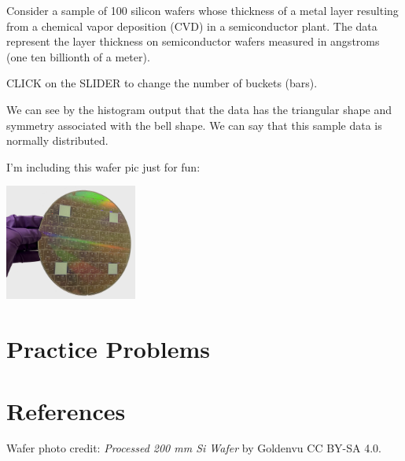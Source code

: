 \documentclass{ximera}
\begin{document}
 
\begin{exploration}\label{exp:histogram1}
Consider a sample of 100 silicon wafers whose thickness of a metal layer resulting from a chemical vapor deposition (CVD) in a semiconductor plant. The data represent the layer thickness on semiconductor wafers measured in angstroms (one ten billionth of a meter).


CLICK on the SLIDER to change the number of buckets (bars).

\begin{onlineOnly}
\begin{center} 
\end{center}
\end{onlineOnly}

We can see by the histogram output that the data has the triangular shape and symmetry associated with the bell shape. We can say that this sample data is normally distributed.


\end{exploration}

I'm including this wafer pic just for fun:

\begin{image}
         \includegraphics[height=1.5in]{200mmWafer.png}
\end{image}


\section*{Practice Problems}

\section*{References}
Wafer photo credit: \textit{Processed 200 mm Si Wafer} by Goldenvu CC BY-SA 4.0.
\end{document}
